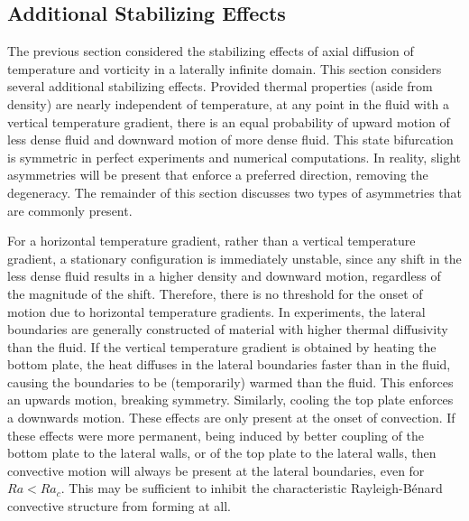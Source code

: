 \documentclass[10pt]{article}
\numberwithin{equation}{section} %
\begin{document}
\subsection{Additional Stabilizing Effects}

The previous section considered the stabilizing effects of axial diffusion of temperature and vorticity in a laterally infinite domain. This section considers several additional stabilizing effects. Provided thermal properties (aside from density) are nearly independent of temperature, at any point in the fluid with a vertical temperature gradient, there is an equal probability of upward motion of less dense fluid and downward motion of more dense fluid. This state bifurcation is symmetric in perfect experiments and numerical computations. In reality, slight asymmetries will be present that enforce a preferred direction, removing the degeneracy. The remainder of this section discusses two types of asymmetries that are commonly present.

For a horizontal temperature gradient, rather than a vertical temperature gradient, a stationary configuration is immediately unstable, since any shift in the less dense fluid results in a higher density and downward motion, regardless of the magnitude of the shift. Therefore, there is no threshold for the onset of motion due to horizontal temperature gradients. In experiments, the lateral boundaries are generally constructed of material with higher thermal diffusivity than the fluid. If the vertical temperature gradient is obtained by heating the bottom plate, the heat diffuses in the lateral boundaries faster than in the fluid, causing the boundaries to be (temporarily) warmed than the fluid. This enforces an upwards motion, breaking symmetry. Similarly, cooling the top plate enforces a downwards motion. These effects are only present at the onset of convection. If these effects were more permanent, being induced by better coupling of the bottom plate to the lateral walls, or of the top plate to the lateral walls, then convective motion will always be present at the lateral boundaries, even for \(Ra<Ra_c\). This may be sufficient to inhibit the characteristic Rayleigh-B\'enard convective structure from forming at all.
\end{document}
